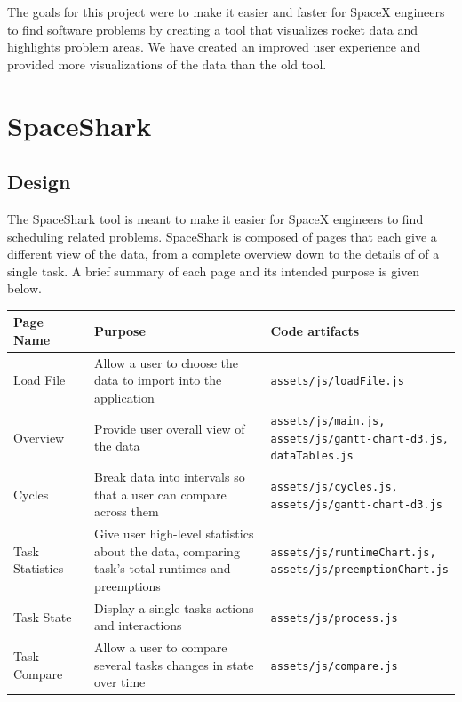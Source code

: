 \documentclass{hmcclinic}
\begin{document}
The goals for this project were to make it easier and faster for SpaceX engineers to find software problems by creating a tool that visualizes rocket data and highlights problem areas. We have created an improved user experience and provided more visualizations of the data than the old tool. 
\chapter{SpaceShark}
\section{Design} %

  The SpaceShark tool is meant to make it easier for SpaceX engineers to find
  scheduling related problems.  SpaceShark is composed of pages that each give a
  different view of the data, from a complete overview down to the details of
  of a single task. A brief summary of each page and its intended purpose is
  given below.

  \begin{center}
    \begin{tabular}{p{0.2\linewidth}p{0.5\linewidth}p{0.3\linewidth}}
     \toprule
      Page Name       & Purpose & Code artifacts     \\
      \midrule
      Load File       & Allow a user to choose the data to import into the
      application        & \texttt{assets/js/loadFile.js}\\
      Overview        & Provide user overall view of the data        &
      \texttt{assets/js/main.js, assets/js/gantt-chart-d3.js, dataTables.js}\\
      Cycles          & Break data into intervals so that a user can compare
      across them        & \texttt{assets/js/cycles.js,
      assets/js/gantt-chart-d3.js}\\
      Task Statistics & Give user high-level statistics about the data,
      comparing task's total runtimes and preemptions        &
      \texttt{assets/js/runtimeChart.js, assets/js/preemptionChart.js}\\
      Task State      & Display a single tasks actions and interactions
      & \texttt{assets/js/process.js}\\
      Task Compare    & Allow a user to compare several tasks changes in state
      over time     & \texttt{assets/js/compare.js}\\
    \bottomrule
    \end{tabular}
  \end{center}
\end{document}
